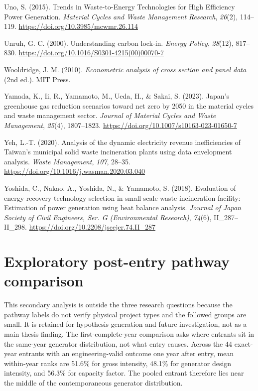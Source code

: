 \documentclass[12pt,letterpaper]{article}
\begin{document}
Uno, S. (2015). Trends in Waste-to-Energy Technologies for High Efficiency
Power Generation. \textit{Material Cycles and Waste Management Research},
\textit{26}(2), 114--119. \url{https://doi.org/10.3985/mcwmr.26.114}

Unruh, G. C. (2000). Understanding carbon lock-in. \textit{Energy Policy},
\textit{28}(12), 817--830.
\url{https://doi.org/10.1016/S0301-4215(00)00070-7}

Wooldridge, J. M. (2010). \textit{Econometric analysis of cross section and
panel data} (2nd ed.). MIT Press.

Yamada, K., Ii, R., Yamamoto, M., Ueda, H., \& Sakai, S. (2023). Japan's
greenhouse gas reduction scenarios toward net zero by 2050 in the material
cycles and waste management sector. \textit{Journal of Material Cycles and
Waste Management}, \textit{25}(4), 1807--1823.
\url{https://doi.org/10.1007/s10163-023-01650-7}

Yeh, L.-T. (2020). Analysis of the dynamic electricity revenue inefficiencies
of Taiwan's municipal solid waste incineration plants using data envelopment
analysis. \textit{Waste Management}, \textit{107}, 28--35.
\url{https://doi.org/10.1016/j.wasman.2020.03.040}

Yoshida, C., Nakao, A., Yoshida, N., \& Yamamoto, S. (2018). Evaluation of
energy recovery technology selection in small-scale waste incineration
facility: Estimation of power generation using heat balance analysis.
\textit{Journal of Japan Society of Civil Engineers, Ser. G (Environmental
Research)}, \textit{74}(6), II\_287--II\_298.
\url{https://doi.org/10.2208/jscejer.74.II_287}

\endgroup

\clearpage
\appendix
{}

\section{Exploratory post-entry pathway comparison}

This secondary analysis is outside the three research questions because the
pathway labels do not verify physical project types and the followed groups are
small. It is retained for hypothesis generation and future investigation, not
as a main thesis finding. The first-complete-year comparison asks where entrants
sit in the same-year generator distribution, not what entry causes. Across the
44 exact-year entrants with an engineering-valid outcome one year after entry,
mean within-year ranks are 51.6\% for gross intensity, 48.1\% for generator
design intensity, and 56.3\% for capacity factor. The pooled entrant therefore
lies near the middle of the contemporaneous generator distribution.
\end{document}
